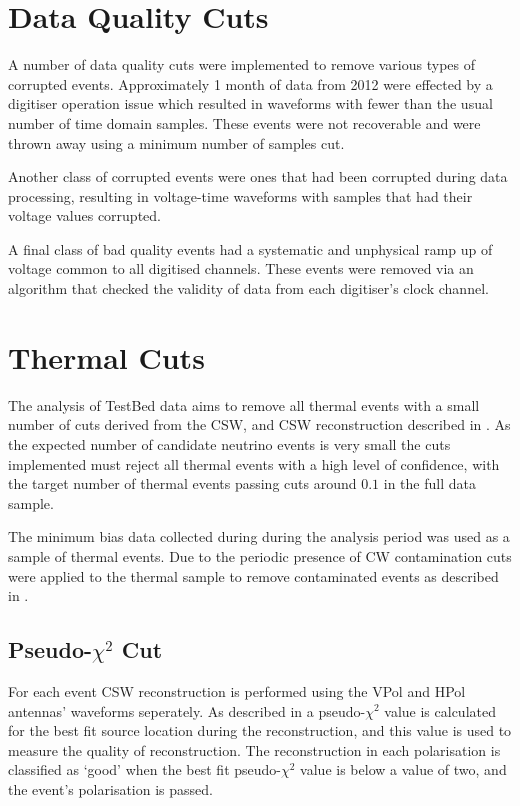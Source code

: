\section{Data Quality Cuts}
\label{sec:Analysis:Data-Quality-Cuts}

A number of data quality cuts were implemented to remove various types of corrupted events. Approximately 1 month of data from 2012 were effected by a digitiser operation issue which resulted in waveforms with fewer than the usual number of time domain samples. These events were not recoverable and were thrown away using a minimum number of samples cut.

Another class of corrupted events were ones that had been corrupted during data processing, resulting in voltage-time waveforms with samples that had their voltage values corrupted.

A final class of bad quality events had a systematic and unphysical ramp up of voltage common to all digitised channels. These events were removed via an algorithm that checked the validity of data from each digitiser's clock channel.


\section{Thermal Cuts}
\label{sec:Analysis:Thermal-Cuts}

The analysis of TestBed data aims to remove all thermal events with a small number of cuts derived from the CSW, and CSW reconstruction described in . As the expected number of candidate neutrino events is very small the cuts implemented must reject all thermal events with a high level of confidence, with the target number of thermal events passing cuts around $0.1$ in the full data sample.

The minimum bias data collected during during the analysis period was used as a sample of thermal events. Due to the periodic presence of CW contamination cuts were applied to the thermal sample to remove contaminated events as described in . 

\subsection{Pseudo-$\chi^{2}$ Cut}
\label{sec:Analysis:Thermal-Cuts:Pseudo-ChiSq}

For each event CSW reconstruction is performed using the VPol and HPol antennas' waveforms seperately. As described in  a pseudo-$\chi^{2}$ value is calculated for the best fit source location during the reconstruction, and this value is used to measure the quality of reconstruction. The reconstruction in each polarisation is classified as `good' when the best fit pseudo-$\chi^{2}$ value is below a value of two, and the event's polarisation is passed.

